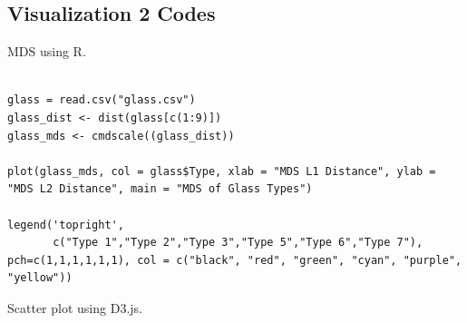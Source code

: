 \documentclass{article}
\begin{document}
\subsection{Visualization 2 Codes}

MDS using R.

\begin{lstlisting}

glass = read.csv("glass.csv")
glass_dist <- dist(glass[c(1:9)])
glass_mds <- cmdscale((glass_dist))

plot(glass_mds, col = glass$Type, xlab = "MDS L1 Distance", ylab = "MDS L2 Distance", main = "MDS of Glass Types")

legend('topright',
       c("Type 1","Type 2","Type 3","Type 5","Type 6","Type 7"), pch=c(1,1,1,1,1,1), col = c("black", "red", "green", "cyan", "purple", "yellow"))

\end{lstlisting}

Scatter plot using D3.js.\cite{legend}
\end{document}
